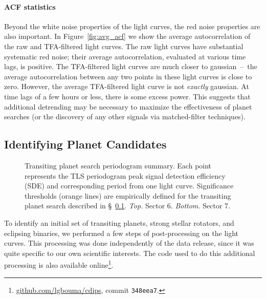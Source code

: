 \documentclass[12pt,twocolumn,tighten]{aastex62}
\begin{document}
\paragraph{ACF statistics}

Beyond the white noise properties of the light curves, the red noise
properties are also important. 
In Figure~\ref{fig:avg_acf} we show the average autocorrelation of the
raw and TFA-filtered light curves.
The raw light curves have substantial systematic red noise; 
their average autocorrelation, evaluated at various time lags, is
positive.
The TFA-filtered light curves are much closer to gaussian~--~the
average autocorrelation between any two points in these light curves
is close to zero.
However, the average TFA-filtered light curve is not {\it exactly}
gaussian.
At time lags of a few hours or less, there is some excess power.
This suggests that additional detrending may be
necessary to maximize the effectiveness of planet searches (or the discovery of
any other signals via matched-filter techniques).


\subsection{Identifying Planet Candidates}
\label{subsec:identifying_ctois}

\begin{figure}[!t]
	\vspace{-0.8cm}
	\caption{
    Transiting planet search periodogram summary.
    Each point represents the TLS periodogram peak signal detection
    efficiency (SDE) and corresponding period from one light curve.
    Significance thresholds (orange lines) are empirically defined for
    the transiting planet search described in
    \S~\ref{subsec:identifying_ctois}.  
    {\it Top.} Sector 6.  {\it Bottom.} Sector 7.
	}
	\label{fig:tlsresults}
\end{figure}


To identify an initial set of transiting planets, strong stellar
rotators, and eclipsing binaries, we performed a few steps of
post-processing on the light curves.  This processing was done
independently of the data release, since it was quite specific to our
own scientific interests.  The code used to do this additional
processing is also available
online\footnote{\url{github.com/lgbouma/cdips}, commit
\texttt{348eea7}.}.
\end{document}

